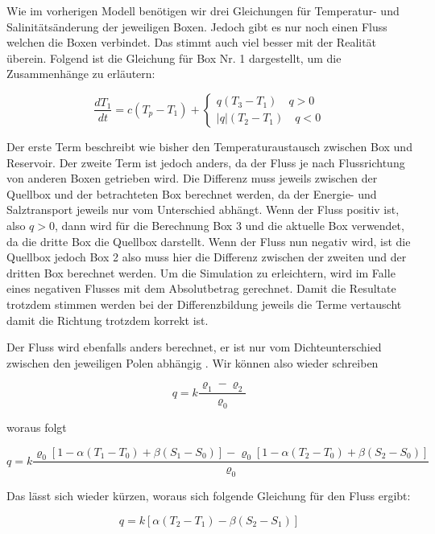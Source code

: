 Wie im vorherigen Modell benötigen wir drei Gleichungen für Temperatur- und Salinitätsänderung der jeweiligen Boxen.
Jedoch gibt es nur noch einen Fluss welchen die Boxen verbindet. Das stimmt auch viel besser mit der Realität überein. Folgend ist die Gleichung für Box Nr. 1 dargestellt, um die Zusammenhänge zu erläutern:

\begin{equation}
\frac{dT_1}{dt} = c(T_p-T_1)+ \begin{cases} q(T_3-T_1)  \quad q>0 \\ |q|(T_2-T_1)  \quad q<0 \end{cases}
\end{equation}

Der erste Term beschreibt wie bisher den Temperaturaustausch zwischen Box und Reservoir. Der zweite Term ist jedoch anders, da der Fluss je nach Flussrichtung von anderen Boxen getrieben wird. Die Differenz muss jeweils zwischen der Quellbox und der betrachteten Box berechnet werden, da der Energie- und Salztransport jeweils nur vom Unterschied abhängt.
Wenn der Fluss positiv ist, also $q>0$, dann wird für die Berechnung Box 3 und die aktuelle Box verwendet, da die dritte Box die Quellbox darstellt. Wenn der Fluss nun negativ wird, ist die Quellbox jedoch Box 2 also muss hier die Differenz zwischen der zweiten und der dritten Box berechnet werden. Um die Simulation zu erleichtern, wird im Falle eines negativen Flusses mit dem Absolutbetrag gerechnet. Damit die Resultate trotzdem stimmen werden  bei der Differenzbildung jeweils die Terme vertauscht damit die Richtung trotzdem korrekt ist. 

Der Fluss wird ebenfalls anders berechnet, er ist nur vom Dichteunterschied zwischen den jeweiligen Polen abhängig \cite{skript:kaperengler}.
Wir können also wieder schreiben

\begin{equation}
q = k\frac{\varrho_1-\varrho_2}{\varrho_0}
\end{equation}

woraus folgt

\begin{equation}
q= k\frac{\varrho_0[1-\alpha(T_1-T_0)+\beta(S_1-S_0)]-\varrho_0[1-\alpha(T_2-T_0)+\beta(S_2-S_0)]}{\varrho_0}
\end{equation}

Das lässt sich wieder kürzen, woraus sich folgende Gleichung für den Fluss ergibt:

\begin{equation}
q = k[\alpha(T_2-T_1)-\beta(S_2-S_1)] 
\end{equation}

